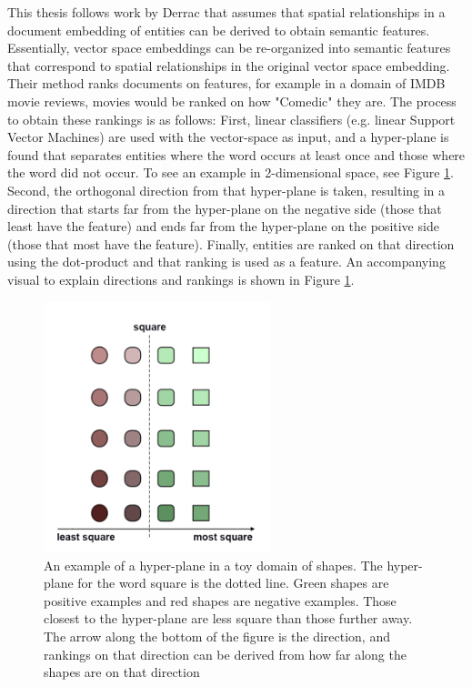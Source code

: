 This thesis follows work by Derrac \cite{Derrac2015}  that assumes that  spatial relationships in a document embedding of entities can be derived to obtain semantic features. Essentially, vector space embeddings can be re-organized into semantic features that correspond to spatial relationships in the original vector space embedding. Their method ranks documents on features, for example in a domain of IMDB movie reviews, movies would be ranked on how "Comedic" they are. The process to obtain these rankings is as follows: First, linear classifiers (e.g. linear Support Vector Machines) are used with the vector-space as input, and a hyper-plane is found that separates entities  where the word occurs at least once and those where the word did not occur. To see an example in 2-dimensional space, see Figure \ref{ch1:introhyp}. Second, the orthogonal direction from that hyper-plane is taken, resulting in a direction that starts  far from the hyper-plane on the negative side (those that least have the feature) and ends far from the hyper-plane on the positive side (those that most have the feature). Finally, entities are ranked on that direction using the dot-product and that ranking is used as a feature. An accompanying visual to explain directions and rankings is shown in Figure \ref{ch1:introhyp}.  %

\begin{figure}[t]
	\includegraphics[width=250px]{images/Toyhyperplane1Direction.png}
	\centering
	\caption{An example of a hyper-plane in a toy domain of shapes. The hyper-plane for the word square is the dotted line. Green shapes are positive examples and red shapes are negative examples. Those closest to the hyper-plane are less square than those further away. The arrow along the bottom of the figure is the direction, and rankings on that direction can be derived from how far along the shapes are on that direction}\label{ch1:introhyp}
\end{figure}


